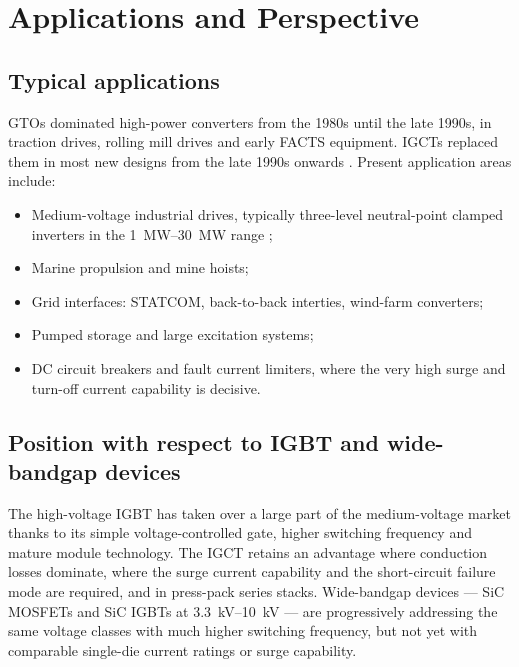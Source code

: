\documentclass[11pt,a4paper]{report}
\begin{document}
\chapter{Applications and Perspective}
\label{ch:applications}

\section{Typical applications}

GTOs dominated high-power converters from the 1980s until the late 1990s, in
traction drives, rolling mill drives and early FACTS equipment. IGCTs replaced
them in most new designs from the late 1990s onwards
\cite{steimer1998hardgto,bernet2000}. Present application areas include:

\begin{itemize}[nosep]
  \item Medium-voltage industrial drives, typically three-level neutral-point
        clamped inverters in the \SIrange{1}{30}{\mega\watt} range
        \cite{rodriguez2007multilevel,wu2006};
  \item Marine propulsion and mine hoists;
  \item Grid interfaces: STATCOM, back-to-back interties, wind-farm converters;
  \item Pumped storage and large excitation systems;
  \item DC circuit breakers and fault current limiters, where the very high
        surge and turn-off current capability is decisive.
\end{itemize}

\section{Position with respect to IGBT and wide-bandgap devices}

The high-voltage IGBT has taken over a large part of the medium-voltage market
thanks to its simple voltage-controlled gate, higher switching frequency and
mature module technology. The IGCT retains an advantage where conduction losses
dominate, where the surge current capability and the short-circuit failure mode
are required, and in press-pack series stacks. Wide-bandgap devices --- SiC
MOSFETs and SiC IGBTs at \SIrange{3.3}{10}{\kilo\volt} --- are progressively
addressing the same voltage classes with much higher switching frequency, but
not yet with comparable single-die current ratings or surge capability.
\end{document}
